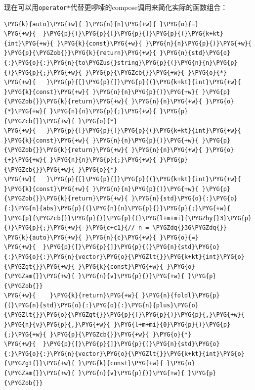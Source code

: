 
现在可以用\texttt{operator*}代替更啰嗦的compose调用来简化实际的函数组合：



\begin{codeblockbg}
\begin{Verbatim}[commandchars=\\\{\},breaklines=true,breakanywhere=true,fontsize=\codefont,xleftmargin=17bp]
\PYG{k}{auto}\PYG{+w}{ }\PYG{n}{n}\PYG{+w}{ }\PYG{o}{=}
\PYG{+w}{  }\PYG{p}{(}\PYG{p}{[}\PYG{p}{]}\PYG{p}{(}\PYG{k+kt}{int}\PYG{+w}{ }\PYG{k}{const}\PYG{+w}{ }\PYG{n}{n}\PYG{p}{)}\PYG{+w}{ }\PYG{p}{\PYGZob{}}\PYG{k}{return}\PYG{+w}{ }\PYG{n}{std}\PYG{o}{:}\PYG{o}{:}\PYG{n}{to\PYGZus{}string}\PYG{p}{(}\PYG{n}{n}\PYG{p}{)}\PYG{p}{;}\PYG{+w}{ }\PYG{p}{\PYGZcb{}}\PYG{+w}{ }\PYG{o}{*}
\PYG{+w}{   }\PYG{p}{[}\PYG{p}{]}\PYG{p}{(}\PYG{k+kt}{int}\PYG{+w}{ }\PYG{k}{const}\PYG{+w}{ }\PYG{n}{n}\PYG{p}{)}\PYG{+w}{ }\PYG{p}{\PYGZob{}}\PYG{k}{return}\PYG{+w}{ }\PYG{n}{n}\PYG{+w}{ }\PYG{o}{*}\PYG{+w}{ }\PYG{n}{n}\PYG{p}{;}\PYG{+w}{ }\PYG{p}{\PYGZcb{}}\PYG{+w}{ }\PYG{o}{*}
\PYG{+w}{   }\PYG{p}{[}\PYG{p}{]}\PYG{p}{(}\PYG{k+kt}{int}\PYG{+w}{ }\PYG{k}{const}\PYG{+w}{ }\PYG{n}{n}\PYG{p}{)}\PYG{+w}{ }\PYG{p}{\PYGZob{}}\PYG{k}{return}\PYG{+w}{ }\PYG{n}{n}\PYG{+w}{ }\PYG{o}{+}\PYG{+w}{ }\PYG{n}{n}\PYG{p}{;}\PYG{+w}{ }\PYG{p}{\PYGZcb{}}\PYG{+w}{ }\PYG{o}{*}
\PYG{+w}{   }\PYG{p}{[}\PYG{p}{]}\PYG{p}{(}\PYG{k+kt}{int}\PYG{+w}{ }\PYG{k}{const}\PYG{+w}{ }\PYG{n}{n}\PYG{p}{)}\PYG{+w}{ }\PYG{p}{\PYGZob{}}\PYG{k}{return}\PYG{+w}{ }\PYG{n}{std}\PYG{o}{:}\PYG{o}{:}\PYG{n}{abs}\PYG{p}{(}\PYG{n}{n}\PYG{p}{)}\PYG{p}{;}\PYG{+w}{ }\PYG{p}{\PYGZcb{}}\PYG{p}{)}\PYG{p}{(}\PYG{l+m+mi}{\PYGZhy{}3}\PYG{p}{)}\PYG{p}{;}\PYG{+w}{ }\PYG{c+c1}{// n = \PYGZdq{}36\PYGZdq{}}
\PYG{k}{auto}\PYG{+w}{ }\PYG{n}{c}\PYG{+w}{ }\PYG{o}{=}
\PYG{+w}{  }\PYG{p}{[}\PYG{p}{]}\PYG{p}{(}\PYG{n}{std}\PYG{o}{:}\PYG{o}{:}\PYG{n}{vector}\PYG{o}{\PYGZlt{}}\PYG{k+kt}{int}\PYG{o}{\PYGZgt{}}\PYG{+w}{ }\PYG{k}{const}\PYG{+w}{ }\PYG{o}{\PYGZam{}}\PYG{+w}{ }\PYG{n}{v}\PYG{p}{)}\PYG{+w}{ }\PYG{p}{\PYGZob{}}
\PYG{+w}{    }\PYG{k}{return}\PYG{+w}{ }\PYG{n}{foldl}\PYG{p}{(}\PYG{n}{std}\PYG{o}{:}\PYG{o}{:}\PYG{n}{plus}\PYG{o}{\PYGZlt{}}\PYG{o}{\PYGZgt{}}\PYG{p}{(}\PYG{p}{)}\PYG{p}{,}\PYG{+w}{ }\PYG{n}{v}\PYG{p}{,}\PYG{+w}{ }\PYG{l+m+mi}{0}\PYG{p}{)}\PYG{p}{;}\PYG{+w}{ }\PYG{p}{\PYGZcb{}}\PYG{+w}{ }\PYG{o}{*}
\PYG{+w}{  }\PYG{p}{[}\PYG{p}{]}\PYG{p}{(}\PYG{n}{std}\PYG{o}{:}\PYG{o}{:}\PYG{n}{vector}\PYG{o}{\PYGZlt{}}\PYG{k+kt}{int}\PYG{o}{\PYGZgt{}}\PYG{+w}{ }\PYG{k}{const}\PYG{+w}{ }\PYG{o}{\PYGZam{}}\PYG{+w}{ }\PYG{n}{v}\PYG{p}{)}\PYG{+w}{ }\PYG{p}{\PYGZob{}}

\end{Verbatim}
\end{codeblockbg}
